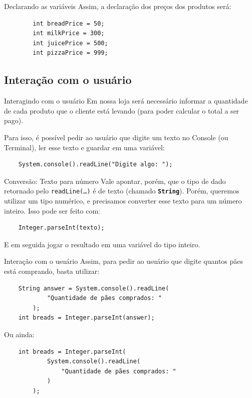 \documentclass{beamer}
\begin{document}
\begin{frame}[fragile]{Declarando as variáveis}
    Assim, a declaração dos preços dos produtos será:

    \begin{verbatim}
        int breadPrice = 50;
        int milkPrice = 300;
        int juicePrice = 500;
        int pizzaPrice = 999;
    \end{verbatim}
\end{frame}


\subsection{Interação com o usuário}

\begin{frame}[fragile]{Interagindo com o usuário}
    Em nossa loja será necessário informar a quantidade de cada produto
    que o cliente está levando (para poder calcular o total a ser pago).

    Para isso, é possível pedir ao usuário que digite um texto no Console (ou
    Terminal), ler esse texto e guardar em uma variável:

    \begin{verbatim}
    System.console().readLine("Digite algo: ");
    \end{verbatim}
\end{frame}

\begin{frame}[fragile]{Conversão: Texto para número}
    Vale apontar, porém, que o tipo de dado retornado pelo
    \texttt{readLine(\ldots)} é de texto (chamado \textbf{\texttt{String}}). Porém,
    queremos utilizar um tipo numérico, e precisamos converter esse texto para
    um número inteiro. Isso pode ser feito com:

    \begin{verbatim}
    Integer.parseInt(texto);
    \end{verbatim}
    E em seguida jogar o resultado em uma variável do tipo inteiro.
\end{frame}

\begin{frame}[fragile]{Interação com o usuário}
    Assim, para pedir ao usuário que digite quantos pães está comprando, basta utilizar:

    \begin{verbatim}
    String answer = System.console().readLine(
            "Quantidade de pães comprados: "
        );
    int breads = Integer.parseInt(answer);
    \end{verbatim}

    Ou ainda:

    \begin{verbatim}
    int breads = Integer.parseInt(
            System.console().readLine(
                "Quantidade de pães comprados: "
            )
        );
    \end{verbatim}
\end{frame}
\end{document}
